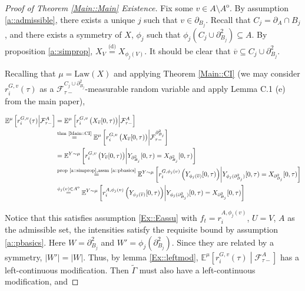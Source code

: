 \documentclass[12pt]{article}
\newcommand{\mb}{\mathbb}
\newcommand{\mc}{\mathcal}
\newcommand{\ov}{\overline}
\newcommand{\os}{\overset}
\newcommand{\te}{\text}
\newcommand{\ind}{\hspace{24pt}}
\newcommand{\exmu}[2]{\mb{E}^{#1}\left[#2\right]}	%
\newcommand{\deq}{\overset{\text{(d)}}{=}}			%
\newcommand{\neigh}[1]{\partial_{#1}}				%
\newcommand{\dneigh}[1]{\partial^2_{#1}}			%
\newcommand{\cl}[1]{\ov{#1}}						%
\newcommand{\Xf}{X}									%
\newcommand{\rate}{r}								%
\newcommand{\F}{\mc{F}}								%
\newcommand{\m}{\mu}								%
\newcommand{\vind}[1]{_{#1}}						%
\newcommand{\tme}[1]{(#1)}							%
\newcommand{\tmi}[1]{#1}							%
\newcommand{\vpara}[1]{^{#1}}						%
\newcommand{\stpara}[1]{_{#1}}						%
\newcommand{\tpara}[1]{_{#1}}						%
\newcommand{\gvpara}[2]{^{#1,#2}}					%
\newcommand{\Xg}{Y}									%
\newcommand{\inte}[1]{{#1}^\mathrm{o}}				%
\newcommand{\alt}[1]{\tilde{#1}}					%
\newcommand{\rt}{\tau}								%
\newcommand{\ratee}{\Gamma}							%
\newcommand{\law}{\te{Law}}							%
\begin{document}
\begin{proof}[Proof of Theorem \ref{Main::Main} Existence]
\ind Fix some \(v \in A\setminus \inte{A}\). By assumption \ref{a::admissible}, there exists a unique \(j\) such that \(v \in \neigh{B_j}\). Recall that \(C_j = \neigh{A}\cap B_j\), and there exists a symmetry of \(\Xf\), \(\phi_j\) such that \(\phi_j(C_j\cup\dneigh{B_j}) \subseteq A\). By proposition \ref{a::simprop}, \(\Xf\vind{V} \deq \Xf\vind{\phi_j(V)}\). It should be clear that \(\cl{v} \subseteq C_j\cup\dneigh{B_j}\).

\ind Recalling that \(\m = \law(\Xf)\) and applying Theorem \ref{Main::CI} (we may consider \(\rate\gvpara{G}{v}\stpara{i}\tme{\rt}\) as a \(\F\vpara{C_j\cup\dneigh{B_j}}\tpara{\rt-}\)-measurable random variable and apply Lemma C.1 (e) from the main paper),

\begin{align*}
\exmu{\m}{\rate\gvpara{G}{v}\stpara{i}\tme{\rt}\middle|\F\vpara{A}\tpara{\rt-}} &=\exmu{\m}{\rate\gvpara{G}{v}\stpara{i}\left(\Xf\vind{\cl{v}}\tmi{[0,\rt)}\right)\middle|\F\vpara{A}\tpara{\rt-}}\\
&\os{\te{thm \ref{Main::CI}}}{=} \exmu{\m}{\rate\gvpara{G}{v}\stpara{i}\left(\Xf\vind{\cl{v}}\tmi{[0,\rt)}\right)\middle|\F\vpara{\dneigh{B_j}}\tpara{\rt-}}\\
&=\exmu{\Xg\sim \m}{\rate\gvpara{G}{v}\stpara{i}\left(\Xg\vind{\cl{v}}\tmi{[0,\rt)}\right)\middle|\Xg\vind{\dneigh{B_j}}\tmi{[0,\rt)} = \Xf\vind{\dneigh{B_j}}\tmi{[0,\rt)}}\\
&\os{\te{prop \ref{a::simprop},assm \ref{a::pbasics}}}{=} \exmu{\Xg\sim \m}{\rate\gvpara{G}{\phi_j(v)}\stpara{i}\left(\Xg\vind{\phi_j(\cl{v})}\tmi{[0,\rt)}\right)\middle|\Xg\vind{\phi_j(\dneigh{B_j})}\tmi{[0,\rt)} = \Xf\vind{\dneigh{B_j}}\tmi{[0,\rt)}}\\
&\os{\phi_j(v) \in \inte{A}}{=} \exmu{\Xg\sim \m}{\rate\gvpara{A}{\phi_j(v)}\stpara{i}\left(\Xg\vind{\phi_j(\cl{v})}\tmi{[0,\rt)}\right)\middle|\Xg\vind{\phi_j(\dneigh{B_j})}\tmi{[0,\rt)} = \Xf\vind{\dneigh{B_j}}\tmi{[0,\rt)}}\\
\end{align*}

Notice that this satisfies assumption \ref{Ex::Eassu} with \(f_t = \rate\gvpara{A}{\phi_j(v)}\stpara{i}\), \(U = V\), \(A\) as the admissible set, the intensities satisfy the requisite bound by assumption \ref{a::pbasics}. Here \(W = \dneigh{B_j}\) and \(W' = \phi_j(\dneigh{B_j})\). Since they are related by a symmetry, \(|W'| = |W|\). Thus, by lemma \ref{Ex::leftmod}, \(\exmu{\m}{\rate\gvpara{G}{v}\stpara{i}\tme{\rt}\middle|\F\vpara{A}\tpara{\rt-}}\) has a left-continuous modification. Then \(\alt{\ratee}\) must also have a left-continuous modification, and 


\end{proof}
\end{document}
